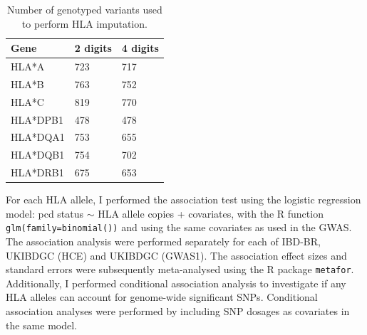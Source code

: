 \begin{table}[H]
  \centering
  \caption{Number of genotyped variants used to perform HLA imputation.}
  \label{table:hla_allele_num}
  \begin{tabular}{|l|l|l|}
  \hline
  Gene     & 2 digits & 4 digits \\ \hline
  HLA*A    & 723      & 717      \\ \hline
  HLA*B    & 763      & 752      \\ \hline
  HLA*C    & 819      & 770      \\ \hline
  HLA*DPB1 & 478      & 478      \\ \hline
  HLA*DQA1 & 753      & 655      \\ \hline
  HLA*DQB1 & 754      & 702      \\ \hline
  HLA*DRB1 & 675      & 653      \\ \hline
  \end{tabular}
  \end{table}
For each HLA allele, I performed the association test using the logistic regression model: pcd status $\sim$ HLA allele copies + covariates, with the R function \Verb+glm(family=binomial())+ and using the same covariates as used in the GWAS. The association analysis were performed separately for each of IBD-BR, UKIBDGC (HCE) and UKIBDGC (GWAS1). The association effect sizes and standard errors were subsequently meta-analysed using the R package \Verb+metafor+. Additionally, I performed conditional association analysis to investigate if any HLA alleles can account for genome-wide significant SNPs. Conditional association analyses were performed by including SNP dosages as covariates in the same model. 



